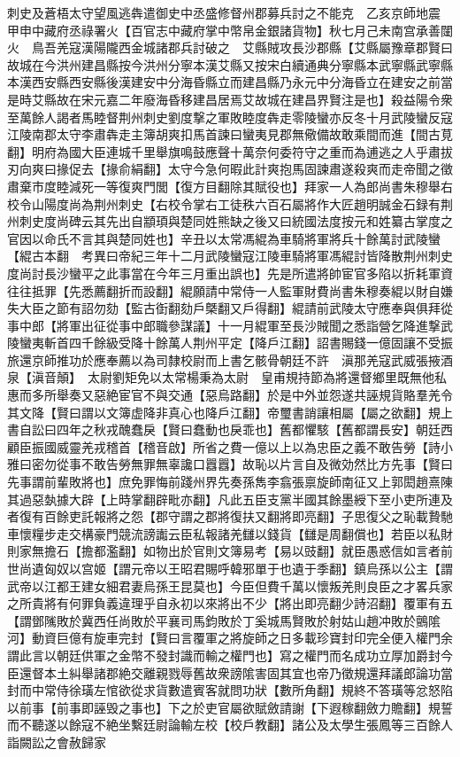 刺史及蒼梧太守望風逃犇遣御史中丞盛修督州郡募兵討之不能克　乙亥京師地震　甲申中藏府丞祿署火【百官志中藏府掌中幣帛金銀諸貨物】秋七月己未南宫承善闥火　鳥吾羌寇漢陽隴西金城諸郡兵討破之　艾縣賊攻長沙郡縣【艾縣屬豫章郡賢曰故城在今洪州建昌縣按今洪州分寧本漢艾縣又按宋白續通典分寧縣本武寧縣武寧縣本漢西安縣西安縣後漢建安中分海昏縣立而建昌縣乃永元中分海昏立在建安之前當是時艾縣故在宋元嘉二年廢海昏移建昌居焉艾故城在建昌界賢注是也】殺益陽令衆至萬餘人謁者馬睦督荆州刺史劉度撃之軍敗睦度犇走零陵蠻亦反冬十月武陵蠻反寇江陵南郡太守李肅犇走主簿胡爽扣馬首諫曰蠻夷見郡無儆備故敢乘間而進【間古莧翻】明府為國大臣連城千里舉旗鳴鼓應聲十萬奈何委符守之重而為逋逃之人乎肅拔刃向爽曰掾促去【掾俞絹翻】太守今急何暇此計爽抱馬固諫肅遂殺爽而走帝聞之徵肅棄市度睦減死一等復爽門閭【復方目翻除其賦役也】拜家一人為郎尚書朱穆舉右校令山陽度尚為荆州刺史【右校令掌右工徒秩六百石屬將作大匠趙明誠金石録有荆州刺史度尚碑云其先出自顓頊與楚同姓熊缺之後又曰統國法度按元和姓纂古掌度之官因以命氏不言其與楚同姓也】辛丑以太常馮緄為車騎將軍將兵十餘萬討武陵蠻【緄古本翻　考異曰帝紀三年十二月武陵蠻寇江陵車騎將軍馮緄討皆降散荆州刺史度尚討長沙蠻平之此事當在今年三月重出誤也】先是所遣將帥宦官多陷以折耗軍資往往抵罪【先悉薦翻折而設翻】緄願請中常侍一人監軍財費尚書朱穆奏緄以財自嫌失大臣之節有詔勿劾【監古衘翻劾戶槩翻又戶得翻】緄請前武陵太守應奉與俱拜從事中郎【將軍出征從事中郎職參謀議】十一月緄軍至長沙賊聞之悉詣營乞降進撃武陵蠻夷斬首四千餘級受降十餘萬人荆州平定【降戶江翻】詔書賜錢一億固讓不受振旅還京師推功於應奉薦以為司隸校尉而上書乞骸骨朝廷不許　滇那羌寇武威張掖酒泉【滇音顛】　太尉劉矩免以太常楊秉為太尉　皇甫規持節為將還督鄉里既無他私惠而多所舉奏又惡絶宦官不與交通【惡烏路翻】於是中外並怨遂共誣規貨賂羣羌令其文降【賢曰謂以文簿虚降非真心也降戶江翻】帝璽書誚讓相屬【屬之欲翻】規上書自訟曰四年之秋戎醜蠢戾【賢曰蠢動也戾乖也】舊都懼駭【舊都謂長安】朝廷西顧臣振國威靈羌戎稽首【稽音啟】所省之費一億以上以為忠臣之義不敢告勞【詩小雅曰密勿從事不敢告勞無罪無辜讒口囂囂】故恥以片言自及微効然比方先事【賢曰先事謂前輩敗將也】庶免罪悔前踐州界先奏孫雋李翕張禀旋師南征又上郭閎趙熹陳其過惡埶據大辟【上時掌翻辟毗亦翻】凡此五臣支黨半國其餘墨綬下至小吏所連及者復有百餘吏託報將之怨【郡守謂之郡將復扶又翻將即亮翻】子思復父之恥載贄馳車懷糧步走交構豪門競流謗讟云臣私報諸羌讎以錢貨【讎是周翻償也】若臣以私財則家無擔石【擔都濫翻】如物出於官則文簿易考【易以豉翻】就臣愚惑信如言者前世尚遺匈奴以宫姬【謂元帝以王昭君賜呼韓邪單于也遺于季翻】鎮烏孫以公主【謂武帝以江都王建女細君妻烏孫王昆莫也】今臣但費千萬以懷叛羌則良臣之才畧兵家之所貴將有何罪負義違理乎自永初以來將出不少【將出即亮翻少詩沼翻】覆軍有五【謂鄧隲敗於冀西任尚敗於平襄司馬鈞敗於丁奚城馬賢敗於射姑山趙冲敗於鸇隂河】動資巨億有旋車完封【賢曰言覆軍之將旋師之日多載珍寶封印完全便入權門余謂此言以朝廷供軍之金幣不發封識而輸之權門也】寫之權門而名成功立厚加爵封今臣還督本土糾舉諸郡絶交離親戮辱舊故衆謗隂害固其宜也帝乃徵規還拜議郎論功當封而中常侍徐璜左悺欲從求貨數遣賓客就問功狀【數所角翻】規終不答璜等忿怒陷以前事【前事即誣毁之事也】下之於吏官屬欲賦斂請謝【下遐稼翻斂力贍翻】規誓而不聽遂以餘寇不絶坐繫廷尉論輸左校【校戶教翻】諸公及太學生張鳳等三百餘人詣闕訟之會赦歸家

